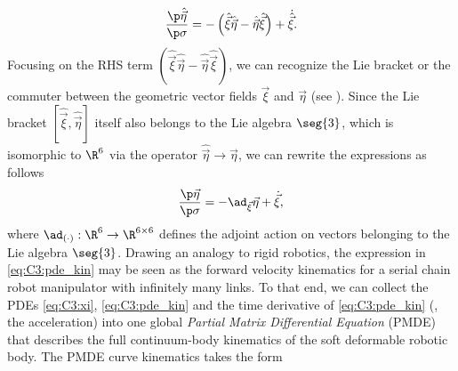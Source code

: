 %
\begin{equation}
\frac{\p \hat{\vec{\eta}}}{\p \sigma} = -\left(\hat{\vec{\xi}}\hat{\vec{\eta}} - \hat{\vec{\eta}}\hat{\vec{\xi}} \right) + \dot{\hat{\vec{\xi}}}.
\end{equation}
%
\noindent Focusing on the RHS term $(\hat{\vec{\xi}}\hat{\vec{\eta}} - \hat{\vec{\eta}}\hat{\vec{\xi}})$, we can recognize the Lie bracket or the commuter between the geometric vector fields $\vec{\xi}$ and $\vec{\eta}$ (see \cite{Murray1994}). Since the Lie bracket $[\hat{\vec{\xi}},\hat{\vec{\eta}}]$ itself also belongs to the Lie algebra $\seg{3}$, which is isomorphic to $\R^6$ via the operator $\hat{\vec{\eta}} \to \vec{\eta}$, we can rewrite the expressions as follows
%
\begin{equation}
\frac{\p \vec{\eta}}{\p \sigma} = -\ad_{\vec{\xi}}\vec{\eta} + \dot{\vec{\xi}},
\label{eq:C3:pde_kin}
\end{equation}
%
\noindent where $\ad_{(\cdot)}: \R^6 \to \R^{6\times 6}$ defines the adjoint action on vectors belonging to the Lie algebra $\seg{3}$. %
Drawing an analogy to rigid robotics, the expression in \eqref{eq:C3:pde_kin} may be seen as the forward velocity kinematics for a serial chain robot manipulator with infinitely many links. To that end, we can collect the PDEs \eqref{eq:C3:xi}, \eqref{eq:C3:pde_kin} and the time derivative of \eqref{eq:C3:pde_kin} (\ie, the acceleration) into one global \textit{Partial Matrix Differential Equation} (PMDE) that describes the full continuum-body kinematics of the soft deformable robotic body. The PMDE curve kinematics takes the form
%
%
